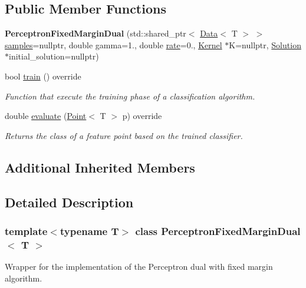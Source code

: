 \subsection*{Public Member Functions}
\begin{DoxyCompactItemize}
\item 
\mbox{\label{class_perceptron_fixed_margin_dual_ac1397a3a17a88769befdf64f83573895}} 
{\bfseries Perceptron\+Fixed\+Margin\+Dual} (std\+::shared\+\_\+ptr$<$ \hyperlink{class_data}{Data}$<$ T $>$ $>$ \hyperlink{class_classifier_a0000b47a2e0784ada4c52d7046c4adb8}{samples}=nullptr, double gamma=1., double \hyperlink{class_classifier_a7b1c4ef87631bd9e46682e5bc4315111}{rate}=0., \hyperlink{class_kernel}{Kernel} $\ast$K=nullptr, \hyperlink{class_solution}{Solution} $\ast$initial\+\_\+solution=nullptr)
\item 
bool \hyperlink{class_perceptron_fixed_margin_dual_a58a5acdd6afaedff53fab23779f01486}{train} () override
\begin{DoxyCompactList}\small\item\em Function that execute the training phase of a classification algorithm. \end{DoxyCompactList}\item 
double \hyperlink{class_perceptron_fixed_margin_dual_acafabadf6d2552fde0bfb32f0344c6e3}{evaluate} (\hyperlink{class_point}{Point}$<$ T $>$ p) override
\begin{DoxyCompactList}\small\item\em Returns the class of a feature point based on the trained classifier. \end{DoxyCompactList}\end{DoxyCompactItemize}
\subsection*{Additional Inherited Members}


\subsection{Detailed Description}
\subsubsection*{template$<$typename T$>$\newline
class Perceptron\+Fixed\+Margin\+Dual$<$ T $>$}

Wrapper for the implementation of the Perceptron dual with fixed margin algorithm. 

